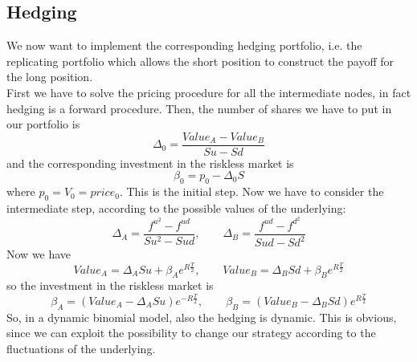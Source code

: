 \subsection{Hedging}
We now want to implement the corresponding hedging portfolio, i.e. the replicating portfolio which allows the short position to construct the payoff for the long position. \\
First we have to solve the pricing procedure for all the intermediate nodes, in fact hedging is a forward procedure. Then, the number of shares we have to put in our portfolio is
\begin{equation}
    \Delta_0 = \dfrac{Value_A-Value_B}{Su-Sd}
\end{equation}
and the corresponding investment in the riskless market is
\begin{equation}
    \beta_0 = p_0-\Delta_0S
\end{equation}
where $p_0 = V_0 = price_0$. This is the initial step. Now we have to consider the intermediate step, according to the possible values of the underlying:
\begin{equation}
    \Delta_A = \dfrac{f^{u^2}-f^{ud}}{Su^2-Sud}, \qquad \Delta_B = \dfrac{f^{ud}-f^{d^2}}{Sud-Sd^2}
\end{equation}
Now we have
\begin{equation*}
    Value_A = \Delta_ASu+\beta_Ae^{R\frac{T}{2}}, \qquad Value_B = \Delta_BSd+\beta_Be^{R\frac{T}{2}}
\end{equation*}
so the investment in the riskless market is
\begin{equation}
    \beta_A = (Value_A-\Delta_ASu)e^{-R\frac{T}{2}}, \qquad \beta_B = (Value_B-\Delta_BSd)e^{R\frac{T}{2}}
\end{equation}
So, in a dynamic binomial model, also the hedging is dynamic. This is obvious, since we can exploit the possibility to change our strategy according to the fluctuations of the underlying.

